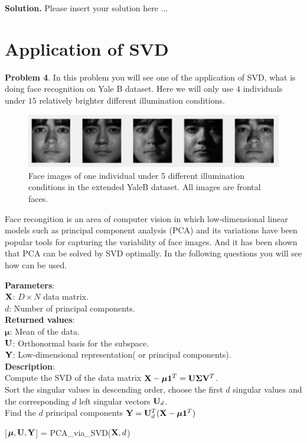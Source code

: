 \documentclass[english,onecolumn]{IEEEtran}
\newcommand{\bV}{{\bf V}}
\newcommand{\bY}{{\bf Y}}
\newcommand{\bX}{{\bf X}}
\newcommand{\bmu}{{\boldsymbol \mu}}
\newcommand{\bSig}{{\boldsymbol \Sigma}}
\newcommand{\bone}{{\boldsymbol 1}}
\newcommand{\bU}{{\bf U}}
\begin{document}
\noindent
\textbf{Solution.}
Please insert your solution here ...


\newpage
\section{Application of SVD}
\noindent\textbf{Problem 4}.
In this problem you will see one of the application of SVD, what is doing face recognition on Yale B dataset. Here we will only use $4$ individuals under $15$ relatively brighter different illumination conditions.

\begin{figure}[h]
    \centering
    \includegraphics{figures/example_face.png}
    \caption{Face images of one individual under 5 different illumination conditions in the extended YaleB dataset. All images are frontal faces.}
    \label{fig:my_label}
\end{figure}
\vspace{-0.3cm}
Face recongition is an area of computer vision in which low-dimensional linear models such as principal component analysis (PCA) and its variations have been popular tools for capturing the variability of face images. And it has been shown that PCA can be solved by SVD optimally. In the following questions you will see how  can be used.

\vspace{0.5cm}
\begin{algorithm}[H]
\textbf{Parameters}:\\
$\bX$: \quad $D\times N $ data matrix.\\
$d$: \quad Number of principal components.\\
\textbf{Returned values}:\\
$\bmu$: \quad Mean of the data.\\
$\bU$: \quad Orthonormal basis for the subspace.\\
$\bY$: \quad Low-dimensional representation( or principal components).\\
\textbf{Description}:\\
Compute the SVD of the data matrix $\bX - \bmu \bone^T = \bU \bSig \bV^T$.\\
Sort the singular values in descending order, choose the first $d$ singular values and the corresponding $d$ left singular vectors $\bU_d$.\\
Find the $d$ principal components $\bY = \bU_d^T(\bX - \bmu \bone^T)$
\caption{[$\bmu, \bU, \bY$] = PCA\_via\_SVD($\bX,d$) }
\label{Alg:PCA}
\end{algorithm}
\vspace{0.5cm}
\end{document}

